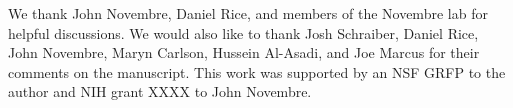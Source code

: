 We thank John Novembre, Daniel Rice, and members of the Novembre lab for helpful
discussions. We would also like to thank Josh Schraiber, Daniel Rice, John
Novembre, Maryn Carlson, Hussein Al-Asadi, and Joe Marcus for their comments on
the manuscript. This work was supported by an NSF GRFP to the author and NIH
grant XXXX to John Novembre.
